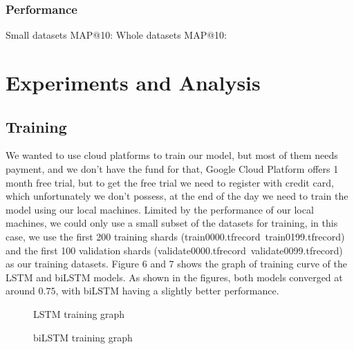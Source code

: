 \documentclass{article}
\begin{document}
\subsubsection{Performance}
Small datasets MAP@10: 
Whole datasets MAP@10: 

\section{Experiments and Analysis}
\subsection{Training}
We wanted to use cloud platforms to train our model, but most of them needs payment, and we don't have the fund for that, Google Cloud Platform offers 1 month free trial, but to get the free trial we need to register with credit card, which unfortunately we don't possess, at the end of the day we need to train the model using our local machines. Limited by the performance of our local machines, we could only use a small subset of the datasets for training, in this case, we use the first 200 training shards (train0000.tfrecord~train0199.tfrecord) and the first 100 validation shards (validate0000.tfrecord~validate0099.tfrecord) as our training datasets. Figure 6 and 7 shows the graph of training curve of the LSTM and biLSTM models. As shown in the figures, both models converged at around $0.75$, with biLSTM having a slightly better performance.

\begin{figure}
  \centering
  \caption{LSTM training graph}
\end{figure}

\begin{figure}
  \centering
  \caption{biLSTM training graph}
\end{figure}
\end{document}
